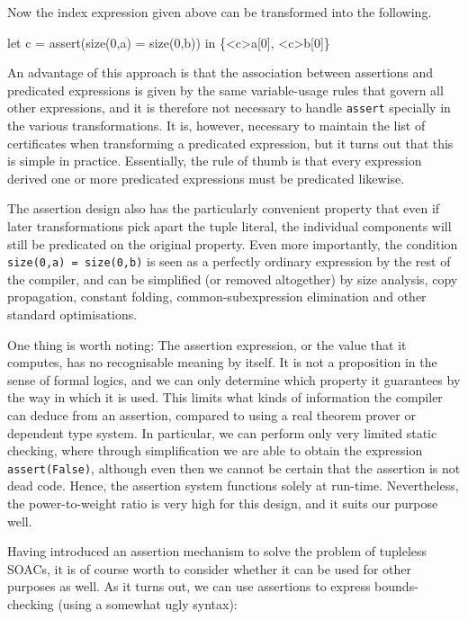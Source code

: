Now the index expression given above can be transformed into the
following.

\begin{colorcode}
let c = assert(size(0,a) = size(0,b)) in
\{<c>a[0], <c>b[0]\}
\end{colorcode}

An advantage of this approach is that the association between
assertions and predicated expressions is given by the same
variable-usage rules that govern all other expressions, and it is
therefore not necessary to handle \texttt{assert} specially in the
various transformations.  It is, however, necessary to maintain the
list of certificates when transforming a predicated expression, but it
turns out that this is simple in practice.  Essentially, the rule of
thumb is that every expression derived one or more predicated
expressions must be predicated likewise.

The assertion design also has the particularly convenient property
that even if later transformations pick apart the tuple literal, the
individual components will still be predicated on the original
property.  Even more importantly, the condition \texttt{size(0,a) =
  size(0,b)} is seen as a perfectly ordinary expression by the rest of
the compiler, and can be simplified (or removed altogether) by size
analysis, copy propagation, constant folding, common-subexpression
elimination and other standard optimisations.

One thing is worth noting: The assertion expression, or the value that
it computes, has no recognisable meaning by itself.  It is not a
proposition in the sense of formal logics, and we can only determine
which property it guarantees by the way in which it is used.  This
limits what kinds of information the compiler can deduce from an
assertion, compared to using a real theorem prover or dependent type
system.  In particular, we can perform only very limited static
checking, where through simplification we are able to obtain the
expression \texttt{assert(False)}, although even then we cannot be
certain that the assertion is not dead code.  Hence, the assertion
system functions solely at run-time.  Nevertheless, the
power-to-weight ratio is very high for this design, and it suits our
purpose well.

Having introduced an assertion mechanism to solve the problem of
tupleless SOACs, it is of course worth to consider whether it can be
used for other purposes as well.  As it turns out, we can use
assertions to express bounds-checking (using a somewhat ugly syntax):

